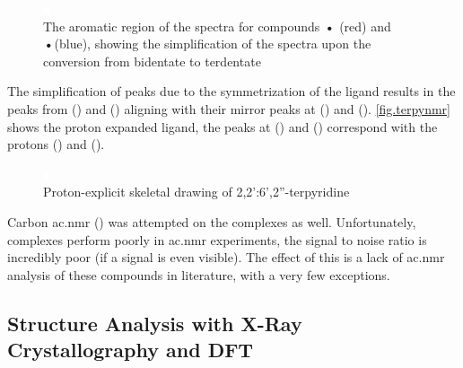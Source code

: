 \begin{figure}[!htbp]
 \begin{center}
  \includegraphics[clip=true]{images/insertgraphic.eps}
 \end{center}
\caption[The aromatic region of the \texorpdfstring{}{1H}  spectra showing bidentate - terdentate conversion]{The aromatic region of the \texorpdfstring{}{1H}  spectra for compounds \textbf{•} (red) and \textbf{•}(blue), showing the simplification of the spectra upon the conversion from bidentate to terdentate}
\label{fig.bidtoter}
\end{figure} 

The simplification of peaks due to the symmetrization of the ligand results in the peaks from () and () aligning with their mirror peaks at () and (). \autoref{fig.terpynmr} shows the proton expanded ligand, the peaks at () and () correspond with the protons () and (). 

\begin{figure}[!htbp]
 \begin{center}
  \includegraphics[clip=true]{images/insertgraphic.eps}
 \end{center}
\caption[Proton-explicit skeletal drawing of 2,2':6',2''-terpyridine]{Proton-explicit skeletal drawing of 2,2':6',2''-terpyridine}
\label{fig.terpynmr}
\end{figure} 

Carbon \gls{ac.nmr} () was attempted on the complexes as well. Unfortunately,  complexes perform poorly in  \gls{ac.nmr} experiments, the signal to noise ratio is incredibly poor (if a signal is even visible). The effect of this is a lack of  \gls{ac.nmr} analysis of these compounds in literature, with a very few exceptions. 

\subsection{Structure Analysis with X-Ray Crystallography and DFT}

